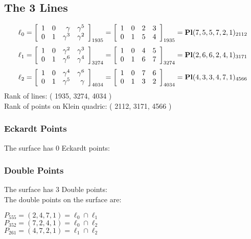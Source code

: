 \documentclass{article}
\begin{document}
{\subsection*{The 3 Lines}
$$
\ell_{0} = 
\left[
\begin{array}{*{4}{r}}
1 & 0 & \gamma  & \gamma^{5}\\
0 & 1 & \gamma^{3} & \gamma^{2}\\
\end{array}
\right]
_{1935}
=
\left[
\begin{array}{*{4}c}
1  & 0  & 2  & 3\\
0  & 1  & 5  & 4\\
\end{array}
\right]_{1935}
={\rm\bf Pl}(7,5,5,7,2,1 )_{2112}$$
$$
\ell_{1} = 
\left[
\begin{array}{*{4}{r}}
1 & 0 & \gamma^{2} & \gamma^{3}\\
0 & 1 & \gamma^{6} & \gamma^{4}\\
\end{array}
\right]
_{3274}
=
\left[
\begin{array}{*{4}c}
1  & 0  & 4  & 5\\
0  & 1  & 6  & 7\\
\end{array}
\right]_{3274}
={\rm\bf Pl}(2,6,6,2,4,1 )_{3171}$$
$$
\ell_{2} = 
\left[
\begin{array}{*{4}{r}}
1 & 0 & \gamma^{4} & \gamma^{6}\\
0 & 1 & \gamma^{5} & \gamma \\
\end{array}
\right]
_{4034}
=
\left[
\begin{array}{*{4}c}
1  & 0  & 7  & 6\\
0  & 1  & 3  & 2\\
\end{array}
\right]_{4034}
={\rm\bf Pl}(4,3,3,4,7,1 )_{4566}$$
Rank of lines: ( 1935, 3274, 4034 )\\
Rank of points on Klein quadric: ( 2112, 3171, 4566 )\\
\subsubsection*{Eckardt Points}
The surface has 0 Eckardt points:\\
\subsubsection*{Double Points}
The surface has 3 Double points:\\
The double points on the surface are:\\
\begin{multicols}{2}
\noindent
$P_{555} = ( 2, 4, 7, 1 ) = \ell_{0} \cap \ell_{1} $\\
$P_{352} = ( 7, 2, 4, 1 ) = \ell_{0} \cap \ell_{2} $\\
$P_{261} = ( 4, 7, 2, 1 ) = \ell_{1} \cap \ell_{2} $\\
\end{multicols}
}
\end{document}
